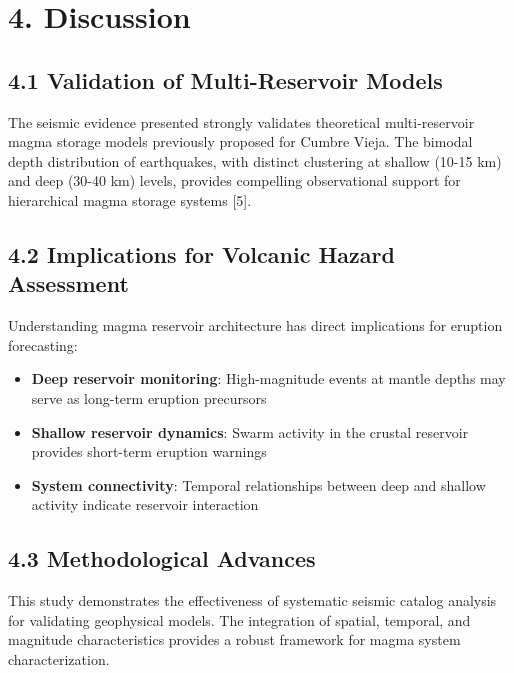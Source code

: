 \documentclass[
  letterpaper,
]{book}
\providecommand{\tightlist}{%
  \setlength{\itemsep}{0pt}\setlength{\parskip}{0pt}}
\begin{document}

\chapter{4. Discussion}\label{discussion}

\section{4.1 Validation of Multi-Reservoir
Models}\label{validation-of-multi-reservoir-models}

The seismic evidence presented strongly validates theoretical
multi-reservoir magma storage models previously proposed for Cumbre
Vieja. The bimodal depth distribution of earthquakes, with distinct
clustering at shallow (10-15 km) and deep (30-40 km) levels, provides
compelling observational support for hierarchical magma storage systems
{[}5{]}.

\section{4.2 Implications for Volcanic Hazard
Assessment}\label{implications-for-volcanic-hazard-assessment}

Understanding magma reservoir architecture has direct implications for
eruption forecasting:

\begin{itemize}
\tightlist
\item
  \textbf{Deep reservoir monitoring}: High-magnitude events at mantle
  depths may serve as long-term eruption precursors
\item
  \textbf{Shallow reservoir dynamics}: Swarm activity in the crustal
  reservoir provides short-term eruption warnings
\item
  \textbf{System connectivity}: Temporal relationships between deep and
  shallow activity indicate reservoir interaction
\end{itemize}

\section{4.3 Methodological Advances}\label{methodological-advances}

This study demonstrates the effectiveness of systematic seismic catalog
analysis for validating geophysical models. The integration of spatial,
temporal, and magnitude characteristics provides a robust framework for
magma system characterization.
\end{document}
